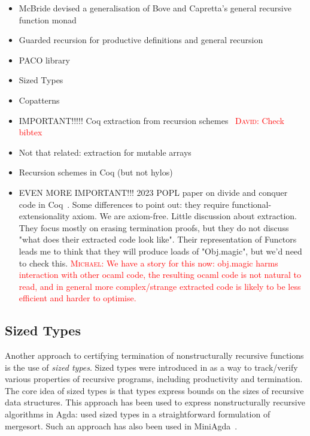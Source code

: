 \documentclass[a4paper, UKenglish, cleveref, autoref, thm-restate]{lipics-v2021}
\newcommand{\dcas}[1]{\textcolor{red}{\textsc{David}: #1}}
\newcommand{\mvol}[1]{\textcolor{red}{\textsc{Michael}: #1}}
\begin{document}
\begin{itemize}
  \item McBride devised a generalisation of Bove and Capretta's general
recursive function monad~\cite{McBride15, BoveC01}
  \item Guarded recursion for productive definitions and general recursion
~\cite{AtkeyM13, PaviottiMB15}
  \item PACO library~\cite{HurNDV13}
  \item Sized Types \cite{HughesPS96, abs-1202-3496}
  \item Copatterns \cite{AbelPTS13, AbelP16}
  \item IMPORTANT!!!!! Coq extraction from recursion
    schemes~\cite{larchey2022braga} \dcas{Check bibtex}
  \item Not that related: extraction for mutable arrays~\cite{SAKAGUCHI2020102372}
  \item Recursion schemes in Coq (but not hylos)~\cite{MurataE19}
  \item EVEN MORE IMPORTANT!!! 2023 POPL paper on divide and conquer code in
    Coq~\cite{AbreuDHJMS23}.  Some differences to point out: they require
    functional-extensionality axiom. We are axiom-free. Little discussion about
    extraction. They focus mostly on erasing termination proofs, but they do
    not discuss "what does their extracted code look like". Their
    representation of Functors leads me to think that they will produce loads
    of "Obj.magic", but we'd need to check this. \mvol{We have a story for this now: obj.magic harms interaction with other ocaml code, the resulting ocaml code is not natural to read, and in general more complex/strange extracted code is likely to be less efficient and harder to optimise.}
\end{itemize}

\subsection{Sized Types}

Another approach to certifying termination of nonstructurally recursive
functions is the use of \emph{sized types}. Sized types were introduced in
\cite{HughesPS96} as a way to track/verify various properties of recursive
programs, including productivity and termination. The core idea of sized types
is that types express bounds on the sizes of recursive data structures. This
approach has been used to express nonstructurally recursive algorithms in Agda:
\cite{CopelloTB14} used sized types in a straightforward formulation of
mergesort. Such an approach has also been used in MiniAgda~\cite{abs-1202-3496}.


\end{document}
